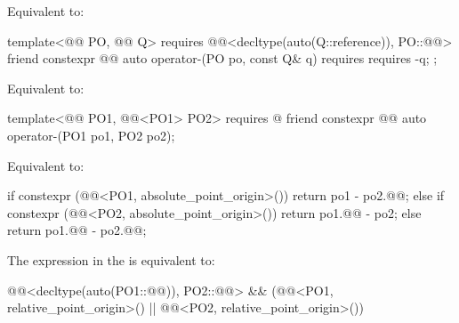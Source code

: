 \begin{itemdescr}
\pnum
\effects
Equivalent to:
\end{itemdescr}

\begin{itemdecl}
template<@@ PO, @@ Q>
  requires @@<decltype(auto(Q::reference)), PO::@@>
friend constexpr @@ auto operator-(PO po, const Q& q)
  requires requires { -q; };
\end{itemdecl}

\begin{itemdescr}
\pnum
\effects
Equivalent to:
\end{itemdescr}

\begin{itemdecl}
template<@@ PO1, @@<PO1{}> PO2>
  requires @\seebelownc@
friend constexpr @@ auto operator-(PO1 po1, PO2 po2);
\end{itemdecl}

\begin{itemdescr}
\pnum
\effects
Equivalent to:
\begin{codeblock}
if constexpr (@@<PO1, absolute_point_origin>()) {
  return po1 - po2.@@;
} else if constexpr (@@<PO2, absolute_point_origin>()) {
  return po1.@@ - po2;
} else {
  return po1.@@ - po2.@@;
}
\end{codeblock}

\pnum
\remarks
The expression in the  is equivalent to:
\begin{codeblock}
@@<decltype(auto(PO1::@@)), PO2::@@> &&
  (@@<PO1, relative_point_origin>() ||
   @@<PO2, relative_point_origin>())
\end{codeblock}
\end{itemdescr}

